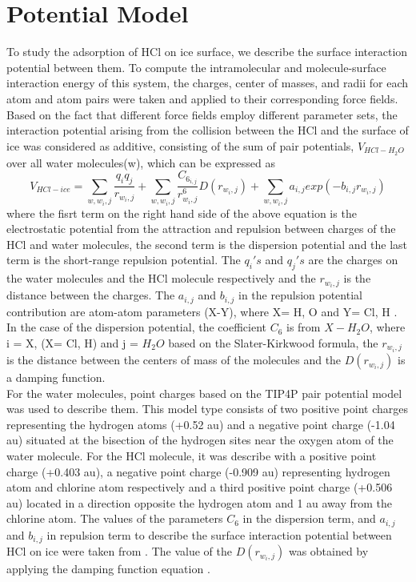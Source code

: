 \documentclass[a4paper,11pt]{report}
\begin{document}
\section{Potential Model}
To study the adsorption of HCl on ice surface, we describe the surface interaction potential between them. To compute the intramolecular and molecule-surface interaction energy of this system, the charges, center of masses, and radii for each atom and atom pairs were taken and applied to their corresponding force fields. Based on the fact that different force fields employ different parameter sets, the interaction potential arising from the collision between the HCl and the surface of ice was considered as additive, consisting of the sum of pair potentials, $V_{HCl-H_{2}O}$ over all water molecules(w), which can be expressed as
\begin{equation}\label{aede3}
V_{HCl-ice} =  \sum_{w,w_{i},j}\frac{q_{i}q_{j}}{r_{w_{i},j}} + \sum_{w,w_{i},j}\frac{C_{6_{i,j}}}{r_{w_{i},j}^{6}}D(r_{w_{i},j}) + \sum_{w,w_{i},j}a_{i,j}exp(-b_{i,j}r_{w_{i},j})
\end{equation}
where the fisrt term on the right hand side of the above equation is the electrostatic potential from the attraction and repulsion between charges of the HCl and water molecules, the second term is the dispersion potential and the last term is the short-range repulsion potential. The $q_{i}'s$ and $q_{j}'s$ are the charges on the water molecules and the HCl molecule respectively and the $r_{w_{i},j}$ is the distance between the charges. The $a_{i,j}$ and $b_{i,j}$ in the repulsion potential contribution are atom-atom parameters (X-Y), where X= H, O and Y= Cl, H . In the case of the dispersion potential, the coefficient $C_{6}$ is from $X-H_{2}O$, where i = X, (X= Cl, H) and j = $H_{2}O$ based on the Slater-Kirkwood formula, the $r_{w_{i},j}$ is the distance between the centers of mass of the molecules and the $D(r_{w_{i},j})$ is a damping function.\\
For the water molecules, point charges based on the TIP4P pair potential model \citep{jorgensen1983comparison} was used to describe them. This model type consists of two positive point charges representing the hydrogen atoms (+0.52 au) and a negative point charge (-1.04 au) situated at the bisection of the hydrogen sites near the oxygen atom of the water molecule. For the HCl molecule, it was describe with a positive point charge (+0.403 au), a negative point charge (-0.909 au) representing hydrogen atom and chlorine atom respectively and a third positive point charge (+0.506 au) located in a direction opposite the hydrogen atom and 1 au away from the chlorine atom. The values of the parameters $C_{6}$ in the dispersion term, and $a_{i,j}$ and $b_{i,j}$ in repulsion term to describe the surface interaction potential between HCl on ice were taken from \citep{woittequand2007classical}. The value of the $D(r_{w_{i},j})$ was obtained by applying the damping function equation \citep{kroes1992sticking}.
\end{document}
